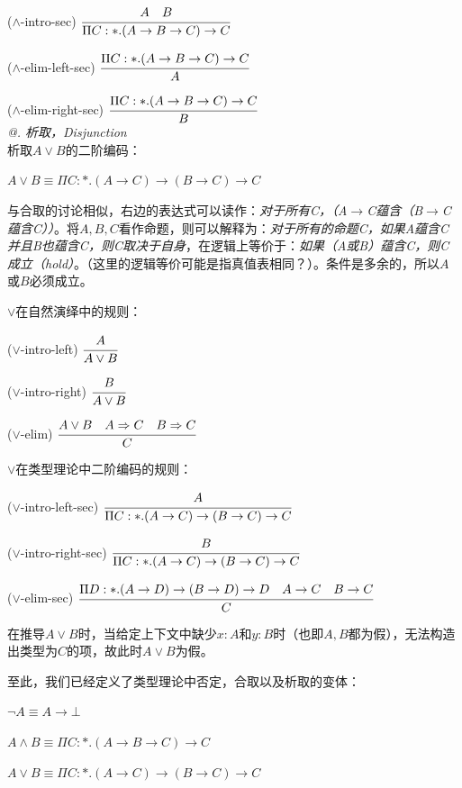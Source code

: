 \documentclass[UTF8]{article}
\makeatletter
\newcommand{\Rmnum}[1]{\expandafter\@slowromancap\romannumeral #1@}
\makeatother
\begin{document}
		($\land$-intro-sec) $\cfrac{A\ \ \ B}{\Pi C:*.(A\rightarrow B\rightarrow C)\rightarrow C}$ 
		
		($\land$-elim-left-sec) $\cfrac{\Pi C:*.(A\rightarrow B\rightarrow C)\rightarrow C}{A}$
		
		($\land$-elim-right-sec) $\cfrac{\Pi C:*.(A\rightarrow B\rightarrow C)\rightarrow C}{B}$ \\
		
	\noindent
	\textit{\Rmnum{2}. 析取，Disjunction}\\
	析取$A\lor B$的二阶编码：
	
		$A\lor B\equiv\Pi C:*.(A\rightarrow C)\rightarrow(B\rightarrow C)\rightarrow C$
		
		与合取的讨论相似，右边的表达式可以读作：\textit{对于所有C，（A$\rightarrow$C蕴含（B$\rightarrow$C蕴含C））}。将$A,B,C$看作命题，则可以解释为：\textit{对于所有的命题C，如果A蕴含C并且B也蕴含C，则C取决于自身}，在逻辑上等价于：\textit{如果（A或B）蕴含C，则C成立（hold）}。（这里的逻辑等价可能是指真值表相同？）。条件是多余的，所以$A$或$B$必须成立。
		
		$\lor$在自然演绎中的规则：
		
		($\lor$-intro-left) $\cfrac{A}{A\lor B}$
		
		($\lor$-intro-right) $\cfrac{B}{A\lor B}$
		
		($\lor$-elim) $\cfrac{A\lor B\ \ \ A\Rightarrow C\ \ \ B\Rightarrow C}{C}$
		
		$\lor$在类型理论中二阶编码的规则：
		
		($\lor$-intro-left-sec) $\cfrac{A}{\Pi C:*.(A\rightarrow C)\rightarrow(B\rightarrow C)\rightarrow C}$
		
		($\lor$-intro-right-sec) $\cfrac{B}{\Pi C:*.(A\rightarrow C)\rightarrow(B\rightarrow C)\rightarrow C}$
		
		($\lor$-elim-sec) $\cfrac{\Pi D:*.(A\rightarrow D)\rightarrow(B\rightarrow D)\rightarrow D\ \ \ A\rightarrow C\ \ \ B\rightarrow C}{C}$
		
		在推导$A\lor B$时，当给定上下文中缺少$x:A$和$y:B$时（也即$A,B$都为假），无法构造出类型为$C$的项，故此时$A\lor B$为假。
		
		至此，我们已经定义了类型理论中否定，合取以及析取的变体：
		
		$\neg A\equiv A\rightarrow\bot$
		
		$A\land B\equiv\Pi C:*.(A\rightarrow B\rightarrow C)\rightarrow C$
		
		$A\lor B\equiv\Pi C:*.(A\rightarrow C)\rightarrow(B\rightarrow C)\rightarrow C$
		
\end{document}
